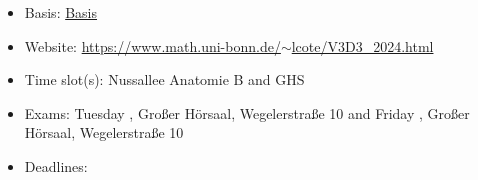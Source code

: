 \begin{tcolorbox}[enhanced,breakable,
	title=General Information,frame style={color=mycolor}]
    \begin{itemize}
        \item Basis: \href{https://basis.uni-bonn.de/qisserver/rds?state=verpublish\&status=init\&vmfile=no&publishid=252386\&moduleCall=webInfo\&publishConfFile=webInfo&publishSubDir=veranstaltung}{Basis}
        \item Website: \href{https://www.math.uni-bonn.de/~lcote/V3D3\_2024.html}{https://www.math.uni-bonn.de/$\sim$lcote/V3D3\_2024.html}
        \item Time slot(s):  Nussallee Anatomie B and  GHS
        \item Exams: Tuesday , Großer Hörsaal, Wegelerstraße 10 and Friday , Großer Hörsaal, Wegelerstraße 10
        \item Deadlines: 
    \end{itemize}
\end{tcolorbox}

